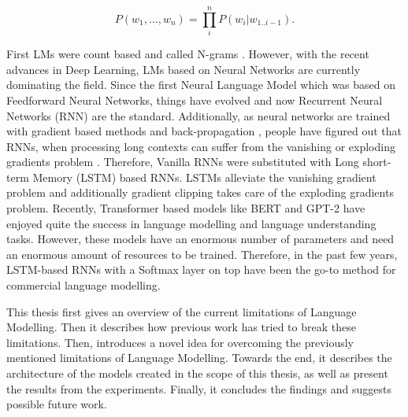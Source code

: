 \begin{displaymath}
    P(w_1, ..., w_n) = \prod_i^n P(w_i | w_{1..i-1}).
\end{displaymath}

First LMs were count based and called N-grams \citep{martin2009speech}. However, with the recent advances in Deep Learning, LMs based on Neural Networks are currently dominating the field. Since the first Neural Language Model \citep{bengio2003neural} which was based on Feedforward Neural Networks, things have evolved and now Recurrent Neural Networks (RNN) \citep{mikolov2010recurrent} are the standard. Additionally, as neural networks are trained with gradient based methods and back-propagation \citep{rumelhart1988learning}, people have figured out that RNNs, when processing long contexts can suffer from the vanishing or exploding gradients problem \citep{hochreiter1998vanishing, pascanu2012understanding, pascanu2013difficulty}. Therefore, Vanilla RNNs were substituted with Long short-term Memory (LSTM) \citep{hochreiter1997long} based RNNs. LSTMs alleviate the vanishing gradient problem and additionally gradient clipping \citep{pascanu2013difficulty} takes care of the exploding gradients problem. Recently, Transformer \citep{vaswani2017attention} based models like BERT \citep{devlin2018bert} and GPT-2 \citep{radford2019language} have enjoyed quite the success in language modelling and language understanding tasks. However, these models have an enormous number of parameters and need an enormous amount of resources to be trained. Therefore, in the past few years, LSTM-based RNNs with a Softmax layer on top have been the go-to method for commercial language modelling.

This thesis first gives an overview of the current limitations of Language Modelling. Then it describes how previous work has tried to break these limitations. Then, introduces a novel idea for overcoming the previously mentioned limitations of Language Modelling. Towards the end, it describes the architecture of the models created in the scope of this thesis, as well as present the results from the experiments. Finally, it concludes the findings and suggests possible future work.
